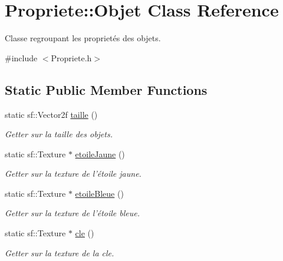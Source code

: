 \hypertarget{classPropriete_1_1Objet}{\section{Propriete\-:\-:Objet Class Reference}
\label{classPropriete_1_1Objet}
}


Classe regroupant les proprietés des objets.  




{\ttfamily \#include $<$Propriete.\-h$>$}

\subsection*{Static Public Member Functions}
\begin{DoxyCompactItemize}
\item 
\hypertarget{classPropriete_1_1Objet_ab01c0cbee66facc2b9585b669c0880f1}{static sf\-::\-Vector2f \hyperlink{classPropriete_1_1Objet_ab01c0cbee66facc2b9585b669c0880f1}{taille} ()}\label{classPropriete_1_1Objet_ab01c0cbee66facc2b9585b669c0880f1}

\begin{DoxyCompactList}\small\item\em Getter sur la taille des objets. \end{DoxyCompactList}\item 
\hypertarget{classPropriete_1_1Objet_a3f39b8110e170fbc8698e4a493b206f3}{static sf\-::\-Texture $\ast$ \hyperlink{classPropriete_1_1Objet_a3f39b8110e170fbc8698e4a493b206f3}{etoile\-Jaune} ()}\label{classPropriete_1_1Objet_a3f39b8110e170fbc8698e4a493b206f3}

\begin{DoxyCompactList}\small\item\em Getter sur la texture de l'étoile jaune. \end{DoxyCompactList}\item 
\hypertarget{classPropriete_1_1Objet_a8e4ef8fc1a6f31b5ef810902415ce697}{static sf\-::\-Texture $\ast$ \hyperlink{classPropriete_1_1Objet_a8e4ef8fc1a6f31b5ef810902415ce697}{etoile\-Bleue} ()}\label{classPropriete_1_1Objet_a8e4ef8fc1a6f31b5ef810902415ce697}

\begin{DoxyCompactList}\small\item\em Getter sur la texture de l'étoile bleue. \end{DoxyCompactList}\item 
\hypertarget{classPropriete_1_1Objet_a1961649f6922042ee6bfe5b44b683d1c}{static sf\-::\-Texture $\ast$ \hyperlink{classPropriete_1_1Objet_a1961649f6922042ee6bfe5b44b683d1c}{cle} ()}\label{classPropriete_1_1Objet_a1961649f6922042ee6bfe5b44b683d1c}

\begin{DoxyCompactList}\small\item\em Getter sur la texture de la cle. \end{DoxyCompactList}\end{DoxyCompactItemize}
